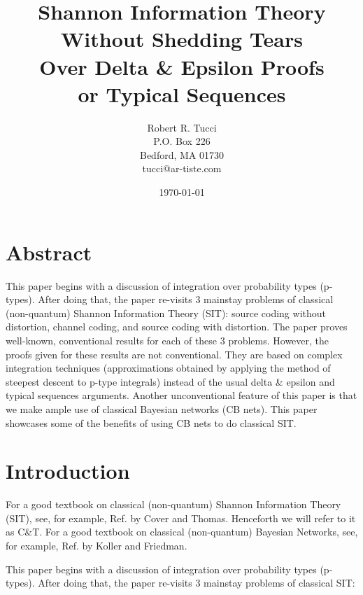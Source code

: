 \documentclass[12pt]{article}
\begin{document}
\title{Shannon Information Theory \\
Without Shedding Tears\\
Over Delta \& Epsilon Proofs\\
or Typical Sequences}


\author{Robert R. Tucci\\
        P.O. Box 226\\
        Bedford,  MA   01730\\
        tucci@ar-tiste.com}


\date{\today}
\maketitle
\vskip2cm
\section*{Abstract}
This paper begins with a
discussion of integration
over probability types (p-types).
After doing that, the paper re-visits
3 mainstay problems of classical (non-quantum)
Shannon Information Theory (SIT):
source coding without distortion,
channel coding,
and source coding with distortion.
The paper proves
well-known, conventional results for
each of these 3 problems. However,
the proofs given for these results
are not conventional. They
are based on complex integration techniques
(approximations obtained by applying
the method of steepest descent to
p-type integrals)
instead of the usual delta \& epsilon
and typical sequences
arguments.
Another
unconventional feature
of this paper
is that we make ample
use of classical Bayesian networks (CB nets).
This paper showcases
some of the benefits of using
CB nets to do classical SIT.




\newpage

\section{Introduction}

For a good textbook on classical (non-quantum)
Shannon
Information Theory (SIT), see, for example,
Ref.\cite{CovTh}
by Cover and Thomas.
Henceforth we will refer to
it
as C\&T.
For a good textbook on classical (non-quantum)
Bayesian Networks, see, for example,
Ref.\cite{KF}
by Koller and Friedman.

This paper begins with a
discussion of integration
over probability types (p-types).
After doing that, the paper re-visits
3 mainstay problems of classical
SIT:
\end{document}
